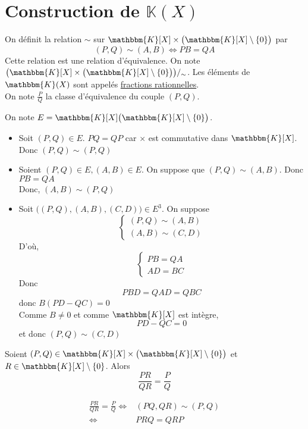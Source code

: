 \part{Construction de $\mathbb{K}(X)$}

\begin{prop-defn}
	On définit la relation $\sim$ sur $\mathbbm{K}[X]\times \big(\mathbbm{K}[X] \setminus \{0\}\big)$ par \[
		(P, Q) \sim (A, B) \iff PB = QA
	\] Cette relation est une relation d'équivalence. On note $\big(\mathbbm{K}[X]\times \big(\mathbbm{K}[X]\setminus \{0\}\big)\big) /_\sim$. Les éléments de $\mathbbm{K}(X)$ sont appelés \underline{fractions rationnelles}.\\
	On note $\frac{P}{Q}$ la classe d'équivalence du couple $(P, Q)$.
\end{prop-defn}

\begin{prv}
	On note $E = \mathbbm{K}[X] \big( \mathbbm{K}[X] \setminus \{0\} \big)$.
	\begin{itemize}
		\item Soit $(P, Q) \in E$. $PQ = QP$ car $\times$ est commutative dans $\mathbbm{K}[X]$. Donc $(P,Q)\sim(P,Q) $
		\item Soient $(P,Q) \in E,  (A, B) \in E$. On suppose que $(P, Q)\sim(A, B)$. Donc $PB = QA$ \\
			Donc, $(A,B) \sim (P,Q)$ 
		\item Soit $\big((P,Q), (A, B), (C,D)\big) \in E^3$. On suppose \[
			\begin{cases}
				(P,Q)\sim (A,B)\\
				(A,B)\sim (C,D)
			\end{cases}
		\] D'où, \[
			\begin{cases}
				PB = QA\\
				AD = BC
			\end{cases}
		\] Donc \[
			PBD = QAD = QBC
		\] donc $B(PD - QC) = 0$\\
		Comme $B \neq 0$ et comme $\mathbbm{K}[X]$ est intègre, \[
			PD - QC = 0
		\] et donc $(P, Q)\sim (C,D)$
	\end{itemize}
\end{prv}

\begin{prop}
	Soient $(P,Q) \in \mathbbm{K}[X] \times \big(\mathbbm{K}[X]\setminus \{0\}\big)$ et $R \in \mathbbm{K}[X]\setminus \{0\}$. Alors \[
		\frac{PR}{QR} = \frac{P}{Q}
	\]
\end{prop}

\begin{prv}
	\begin{align*}
		\frac{PR}{QR}=\frac{P}{Q}\iff& (PQ,QR)\sim (P,Q)\\
		\iff& PRQ = QRP
	\end{align*}
\end{prv}

